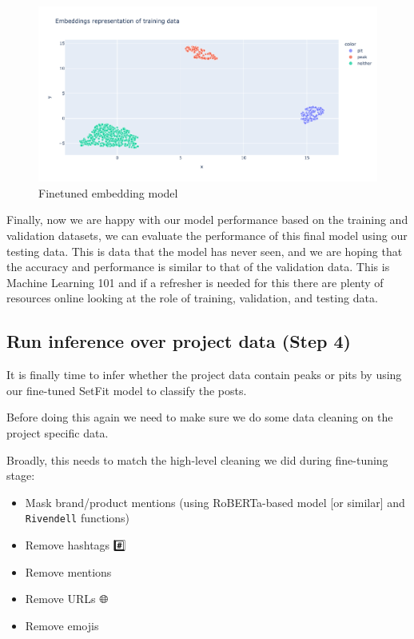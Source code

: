 \documentclass[
  letterpaper,
  DIV=11,
  numbers=noendperiod]{scrreprt}
\providecommand{\tightlist}{%
  \setlength{\itemsep}{0pt}\setlength{\parskip}{0pt}}\usepackage{longtable,booktabs,array}
\begin{document}
\begin{figure}[H]

{\centering \includegraphics{./img/embedding_trained.png}

}

\caption{Finetuned embedding model}

\end{figure}%

Finally, now we are happy with our model performance based on the
training and validation datasets, we can evaluate the performance of
this final model using our testing data. This is data that the model has
never seen, and we are hoping that the accuracy and performance is
similar to that of the validation data. This is Machine Learning 101 and
if a refresher is needed for this there are plenty of resources online
looking at the role of training, validation, and testing data.

\subsection{Run inference over project data (Step 4)}\label{step-four}

It is finally time to infer whether the project data contain peaks or
pits by using our fine-tuned SetFit model to classify the posts.

Before doing this again we need to make sure we do some data cleaning on
the project specific data.

Broadly, this needs to match the high-level cleaning we did during
fine-tuning stage:

\begin{itemize}
\tightlist
\item
  Mask brand/product mentions (using RoBERTa-based model {[}or
  similar{]} and \texttt{Rivendell} functions)
\item
  Remove hashtags \#️⃣
\item
  Remove mentions 💬
\item
  Remove URLs 🌐
\item
  Remove emojis 🐙
\end{itemize}
\end{document}
